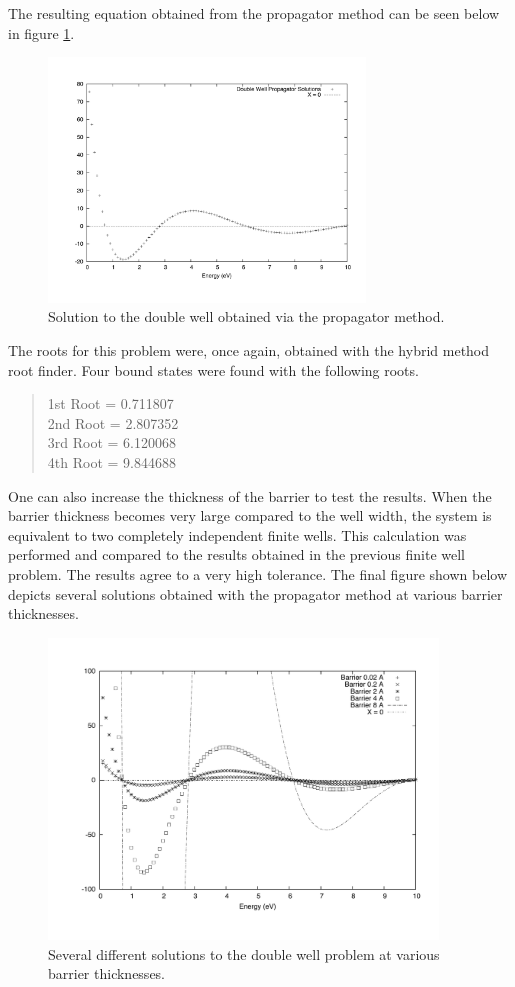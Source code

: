 \documentclass[12pt]{article}
\begin{document}
The resulting equation obtained from the propagator method can be seen below in figure \ref{fig:DoubleWell}.
\begin{figure}[!h]
\centering
\includegraphics[width =120 mm, height = 65mm]{DoubleWell.pdf}
\caption{Solution to the double well obtained via the propagator method.}
\label{fig:DoubleWell}
\end{figure}
The roots for this problem were, once again, obtained with the hybrid method root finder.  Four bound states were found with the following roots.
\begin{quote}
\begin{center}
1st Root = 0.711807\\
2nd Root = 2.807352\\
3rd Root = 6.120068\\
4th Root = 9.844688\\
\end{center}
\end{quote}
One can also increase the thickness of the barrier to test the results.  When the barrier thickness becomes very large compared to the well width, the system is equivalent to two completely independent finite wells.  This calculation was performed and compared to the results obtained in the previous finite well problem.  The results agree to a very high tolerance.  The final figure shown below depicts several solutions obtained with the propagator method at various barrier thicknesses.
\begin{figure}[!h]
\centering
\includegraphics[width =120 mm, height = 80mm]{DoubleWellBarrier.pdf}
\caption{Several different solutions to the double well problem at various barrier thicknesses.}
\label{fig:DoubleWellBarrier}
\end{figure}
\end{document}
